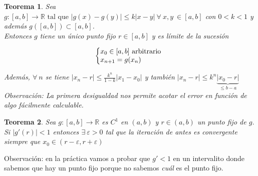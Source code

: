 \documentclass{article}
\newtheorem{theorem}{Teorema}
\def\R{\mathbb{R}}
\begin{document}
\begin{theorem}Sea $g :[a,b] \rightarrow \R\text{ tal que }|g(x)-g(y)|\leq k |x-y|\ \forall\ x,y\ \in [a,b]$ con $0<k<1$ y además $g([a,b]) \subset [a,b]$. \\

Entonces $g$ tiene un único punto fijo $r \in [a,b]$ y es límite de la sucesión

\begin{equation}
  \left\{
  \begin{array}{@{}ll@{}}
    x_0 \in [a,b] \text{ arbitrario} \\
    x_{n+1} = g(x_n)
  \end{array}\right.
\end{equation} 

Además, $\forall\ n$ se tiene $|x_n-r| \leq \frac{k^n}{1-k} |x_1-x_0|$ y también $|x_n-r|\leq k^n \underbrace{|x_0 -r|}_{\leq b-a}$ \\

Observación: La primera desigualdad nos permite acotar el error en función de algo fácilmente calculable.

\end{theorem} 




\begin{theorem}  Sea  $g :[a,b] \rightarrow \R$ es $C^1$ en $(a,b)$ y $r\in(a,b)$ un punto fijo de $g$. Si $|g'(r)|<1$ entonces $\exists\ \varepsilon>0$ tal que la iteración de antes es convergente siempre que $x_0 \in (r-\varepsilon,r+\varepsilon)$
\end{theorem} 

Observación: en la práctica vamos a probar que $g' < 1$ en un intervalito donde sabemos que hay un punto fijo porque no sabemos \textit{cuál} es el punto fijo.
\end{document}

